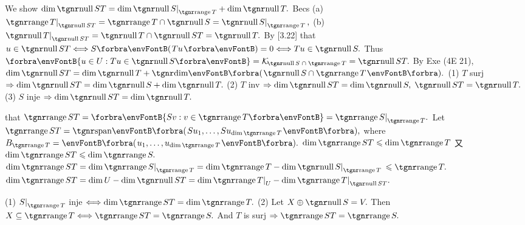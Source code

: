 We show $\dim \null ST=\dim \null S\mmid_{\range T} + \dim \null T.$\parSol{}
Becs (a) \uline{$\range T\mmid_{\null ST}=\range T\cap\null S=\null S\mmid_{\range T}\,,$}\parSol{}
 (b) \uline{$\null T\mmid_{\null ST}=\null T\cap\null ST=\null T.$} By [3.22]\PfEnd\parSol{\vspace{6pt}}
\Or \NOTICE that \uline{$u\in\null ST\Longleftrightarrow S\Par{Tu}=0\Longleftrightarrow Tu\in\null S.$}\parSol{}
\Blind{\Or}Thus \uline{$\Bra{u\in U:Tu\in\null S}=\mathcal{K}_{\!\null S\;\cap\;\range T}=\null ST.$}\parSol{}
\Blind{\Or}By Exe (4E 21), $\dim\null ST=\dim\null T+\Dim\BigPar{\null S\cap\range T}.$\PfEnd\vspace{4pt}
\ACoro (1) $T$ surj $\Rightarrow\dim\null ST=\dim\null S+\dim\null T.$\parCor
(2) $T$ inv $\Rightarrow\dim\null ST=\dim\null S,\;\null ST=\null T.$\parCor
(3) $S$ inje $\Rightarrow\dim\null ST=\dim\null T.$\vspace{-3pt}
\SepLine

\NOTICE that \uline{$\range ST=\Bra{Sv:v\in\range T}=\range S\mmid_{\range T}.$}\parSol{}
Let $\range ST=\Span[\BigPar]{Su_1,\dots,Su_{\dim\range T}},$ where $B_{\range T}=\BigPar{u_1,\dots,u_{\dim\range T}}.$\parSol{}
$\dim\range ST\leqslant \dim\range T$
又 $\dim\range ST\leqslant \dim\range S.$\PfEnd\parSol{\vspace{4pt}}
\Or \uline{$\dim\range ST=\dim\range S\mmid_{\range T}=\dim\range T-\dim\null S\mmid_{\range T}$}${}\leqslant \range T.$\PfEnd\parSol{}
\AComm $\dim\range ST=\dim U-\dim\null ST=\dim \range T\mmid_{U}-\dim\range T\mmid_{\null ST}.$\par\vspace{4pt}
\ACoro (1) $S\mmid_{\range T}$ inje $\Longleftrightarrow\dim\range ST=\dim\range T.$\parCor
(2) Let $X\oplus\null S=V.$ Then $X\subseteq\range T\Longleftrightarrow\range ST=\range S.$\vspace{-2pt}\parCor
{} And $T$ is surj $\Rightarrow\range ST=\range S.$
\SepLine

